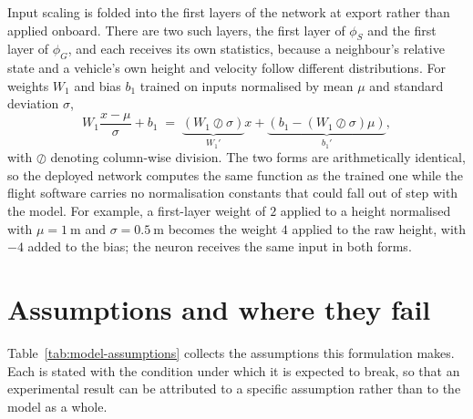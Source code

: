 Input scaling is folded into the first layers of the network at export rather than applied
onboard. There are two such layers, the first layer of $\phi_S$ and the first layer of $\phi_G$,
and each receives its own statistics, because a neighbour's relative state and a vehicle's own
height and velocity follow different distributions. For
weights $W_1$ and bias $b_1$ trained on inputs normalised by mean $\mu$ and standard deviation
$\sigma$,
%
\begin{equation}
  W_1 \frac{x - \mu}{\sigma} + b_1
  \;=\; \underbrace{\left(W_1 \oslash \sigma\right)}_{W_1'} x
      + \underbrace{\left(b_1 - \left(W_1 \oslash \sigma\right)\mu\right)}_{b_1'},
  \label{eq:model-fold}
\end{equation}
%
with $\oslash$ denoting column-wise division. The two forms are arithmetically identical, so the
deployed network computes the same function as the trained one while the flight software carries no
normalisation constants that could fall out of step with the model.
For example, a first-layer weight of $2$ applied to a height normalised with $\mu = \SI{1}{\metre}$
and $\sigma = \SI{0.5}{\metre}$ becomes the weight $4$ applied to the raw height, with $-4$ added to
the bias; the neuron receives the same input in both forms.

\section{Assumptions and where they fail}
\label{sec:model-assumptions}

Table~\ref{tab:model-assumptions} collects the assumptions this formulation makes. Each is stated
with the condition under which it is expected to break, so that an experimental result can be
attributed to a specific assumption rather than to the model as a whole.

